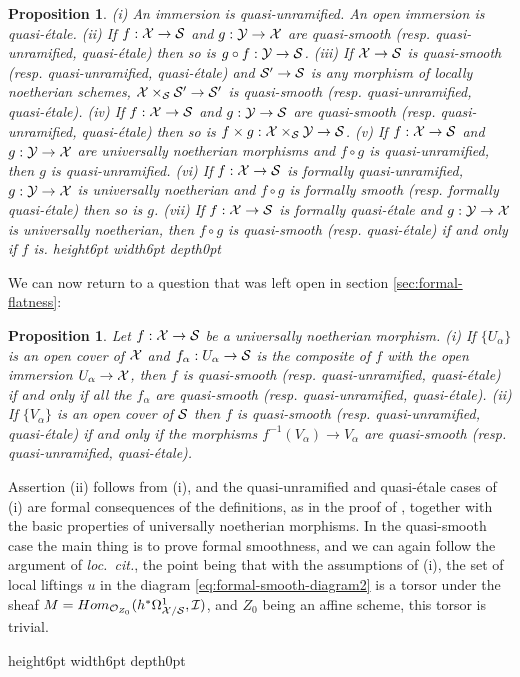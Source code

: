 \documentclass{article}
\theoremstyle{change}
\newtheorem{prop}[subsubsection]{Proposition}
\numberwithin{equation}{subsubsection}
\newcommand{\demobox}{\vrule height6pt width6pt depth0pt}
\newcommand{\nodemo}{\unskip\nobreak\hfil\qquad
\demobox\parfillskip=0pt\par}
\newenvironment{demo}{\noindent{\it Proof.}}
{{\unskip\nobreak\hfil\qquad
\demobox\parfillskip=0pt\par}
\medskip}
\begin{document}
\begin{prop}\label{prop:smooth-sorites}
  (i) An immersion is quasi-unramified. An open immersion is
  quasi-\'etale.  (ii) If $f:{\cal X}\to{\cal S}$ and $g:{\cal Y}\to{\cal X}$ are
  quasi-smooth (resp. quasi-unramified, quasi-\'etale) then so is
  $g\circ f:{\cal Y}\to{\cal S}$. (iii) If ${\cal X}\to{\cal S}$ is quasi-smooth
  (resp. quasi-unramified, quasi-\'etale) and ${\cal S}'\to{\cal S}$ is any
  morphism of locally noetherian schemes, ${\cal X}\times_{\cal S}{\cal S}'\to{\cal S}'$
  is quasi-smooth (resp. quasi-unramified, quasi-\'etale). (iv) If
  $f:{\cal X}\to{\cal S}$ and $g:{\cal Y}\to{\cal S}$ are quasi-smooth
  (resp. quasi-unramified, quasi-\'etale) then so is
  $f\times g:{\cal X}\times_{\cal S}{\cal Y}\to{\cal S}$. (v) If $f:{\cal X}\to{\cal S}$ and
  $g:{\cal Y}\to{\cal X}$ are universally noetherian morphisms and $f\circ g$ is
  quasi-unramified, then $g$ is quasi-unramified. (vi) If
  $f:{\cal X}\to{\cal S}$ is formally quasi-unramified, $g:{\cal Y}\to{\cal X}$ is
  universally noetherian and $f\circ g$ is formally smooth
  (resp. formally quasi-\'etale) then so is $g$. (vii) If
  $f:{\cal X}\to{\cal S}$ is formally quasi-\'etale and $g:{\cal Y}\to{\cal X}$ is
  universally noetherian, then $f\circ g$ is quasi-smooth
  (resp. quasi-\'etale) if and only if $f$ is.\nodemo
\end{prop}

We can now return to a question that was left open in section
\ref{sec:formal-flatness}:

\begin{prop}\label{prop:quasi-smooth-is-local}
  Let $f:{\cal X}\to{\cal S}$ be a universally noetherian morphism. (i) If
  $\{U_\alpha\}$ is an open cover of ${\cal X}$ and
  $f_\alpha:U_\alpha\to{\cal S}$ is the composite of $f$ with the open
  immersion $U_\alpha\to{\cal X}$, then $f$ is quasi-smooth
  (resp. quasi-unramified, quasi-\'etale) if and only if all the
  $f_\alpha$ are quasi-smooth (resp. quasi-unramified,
  quasi-\'etale). (ii) If $\{V_\alpha\}$ is an open cover of ${\cal S}$
  then $f$ is quasi-smooth (resp. quasi-unramified, quasi-\'etale) if
  and only if the morphisms $f^{-1}(V_\alpha)\to V_\alpha$ are
  quasi-smooth (resp. quasi-unramified, quasi-\'etale).
\end{prop}
\begin{demo}
  Assertion (ii) follows from (i), and the quasi-unramified and
  quasi-\'etale cases of (i) are formal consequences of the
  definitions, as in the proof of \cite[IV Prop. 17.1.6]{EGA},
  together with the basic properties of universally noetherian
  morphisms. In the quasi-smooth case the main thing is to prove
  formal smoothness, and we can again follow the argument of
  \textit{loc.\ cit.}, the point being that with the assumptions of
  (i), the set of local liftings $u$ in the diagram
  \ref{eq:formal-smooth-diagram2} is a torsor under the sheaf
  $M=Hom_{{\cal O}_{Z_0}}(h^*\Omega^1_{{\cal X}/{\cal S}},{\cal I})$, and $Z_0$ being an
  affine scheme, this torsor is trivial.
\end{demo}
\end{document}
